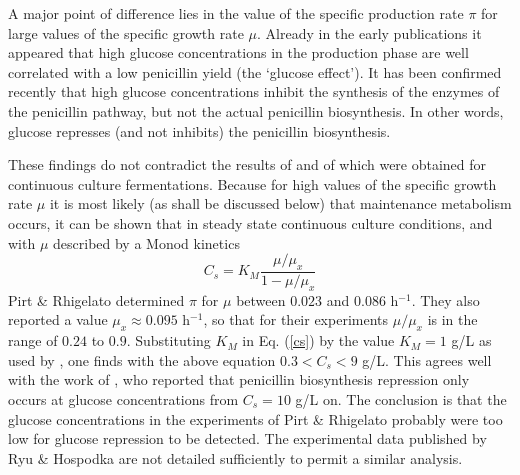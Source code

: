 \documentclass[ss]{imsart}
\numberwithin{equation}{section}
\theoremstyle{plain}
\begin{document}
A major
point of difference lies in the value of the specific production rate $\pi$ for
large values of the specific growth rate $\mu$.
Already in the early publications \cite{r1,r2,r3}
it appeared that high glucose
concentrations in the production phase are well correlated with a
low penicillin yield (the
`glucose effect'). It has been confirmed recently
\cite{r1,r2,r3,r4}
that
high glucose concentrations inhibit the synthesis of the enzymes of the
penicillin pathway, but not the actual penicillin biosynthesis.
In other words, glucose represses (and not inhibits) the penicillin
biosynthesis.

These findings do not contradict the results of
\cite{r1}  and of \cite{r4} which were obtained for
continuous culture fermentations.
Because for high values of the specific
growth rate $\mu$ it is most likely (as shall be discussed below) that
maintenance metabolism occurs, it can be shown that
in steady state continuous culture conditions, and with $\mu$ described by a Monod kinetics
\begin{equation}
    C_{s}  =  K_{M} \frac{\mu/\mu_{x}}{1-\mu/\mu_{x}} \label{cs}
\end{equation}
Pirt \& Rhigelato determined $\pi$ for $\mu$ between
$0.023$ and $0.086$ h$^{-1}$.
They also reported a value $\mu_{x} \approx 0.095$
h$^{-1}$, so that for their experiments $\mu/\mu_{x}$ is in the range
of $0.24$ to $0.9$.
Substituting $K _M$ in Eq. (\ref{cs}) by
the value $K_{M}=1$ g/L as used by \cite{r1}, one finds
with the above equation $0.3 < C_{s} < 9$ g/L. This agrees well with
the work of  \cite{r4}, who reported that penicillin biosynthesis
repression only occurs at glucose concentrations from $C_{s}=10$ g/L on.
The conclusion is that the glucose concentrations in the experiments of
Pirt \& Rhigelato probably were too low for glucose repression to be
detected. The experimental data published by Ryu \& Hospodka
are not detailed sufficiently to permit a similar analysis.
\end{document}
